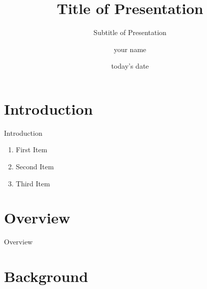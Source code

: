 \documentclass[newPxFont]{beamer}
\title{Title of Presentation}
\subtitle{Subtitle of Presentation}
\date{today's date}
\author{your name}
\institute{University of Illinois}
\begin{document}
%
%

\maketitle


%
%

\section*{Introduction}


\begin{frame}[c]{Introduction}

\begin{enumerate}
\item{First Item}   
\item{Second Item}  
\item{Third Item}
\end{enumerate}

\end{frame}



\section*{Overview}
\begin{frame}{Overview}
\tableofcontents[hideallsubsections]
\end{frame}


%
%

\section{Background}
\end{document}
